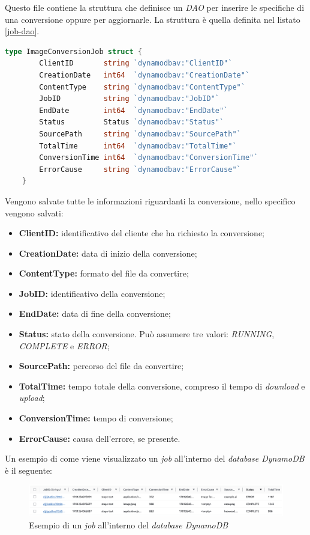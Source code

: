 Questo file contiene la struttura che definisce un \emph{DAO} per inserire le
specifiche di una conversione oppure per aggiornarle. La struttura è quella
definita nel listato \ref{job-dao}.
\newpage
\begin{lstlisting}[label=job-dao,caption=Struttura di un \emph{job} di una conversione,captionpos=b, language=go]
    type ImageConversionJob struct {
        ClientID       string `dynamodbav:"ClientID"`
        CreationDate   int64  `dynamodbav:"CreationDate"`
        ContentType    string `dynamodbav:"ContentType"`
        JobID          string `dynamodbav:"JobID"`
        EndDate        int64  `dynamodbav:"EndDate"`
        Status         Status `dynamodbav:"Status"`
        SourcePath     string `dynamodbav:"SourcePath"`
        TotalTime      int64  `dynamodbav:"TotalTime"`
        ConversionTime int64  `dynamodbav:"ConversionTime"`
        ErrorCause     string `dynamodbav:"ErrorCause"`
    }
\end{lstlisting}

Vengono salvate tutte le informazioni riguardanti la conversione, nello
specifico vengono salvati:
\begin{itemize}
      \item \textbf{ClientID:} identificativo del cliente che ha richiesto la
            conversione;
      \item \textbf{CreationDate:} data di inizio della conversione;
      \item \textbf{ContentType:} formato del file da convertire;
      \item \textbf{JobID:} identificativo della conversione;
      \item \textbf{EndDate:} data di fine della conversione;
      \item \textbf{Status:} stato della conversione. Può assumere tre valori: \emph{RUNNING}, \emph{COMPLETE} e \emph{ERROR};
      \item \textbf{SourcePath:} percorso del file da convertire;
      \item \textbf{TotalTime:} tempo totale della conversione, compreso il tempo
            di \emph{download} e \emph{upload};
      \item \textbf{ConversionTime:} tempo di conversione;
      \item \textbf{ErrorCause:} causa dell'errore, se presente.
\end{itemize}

Un esempio di come viene visualizzato un \emph{job} all'interno del
\emph{database DynamoDB} è il seguente:
\begin{figure}[H]
      \centering
      \includegraphics[width=1\textwidth]{images/esempio-job-dynamo.png}
      \caption{Esempio di un \emph{job} all'interno del \emph{database DynamoDB}}
\end{figure}


